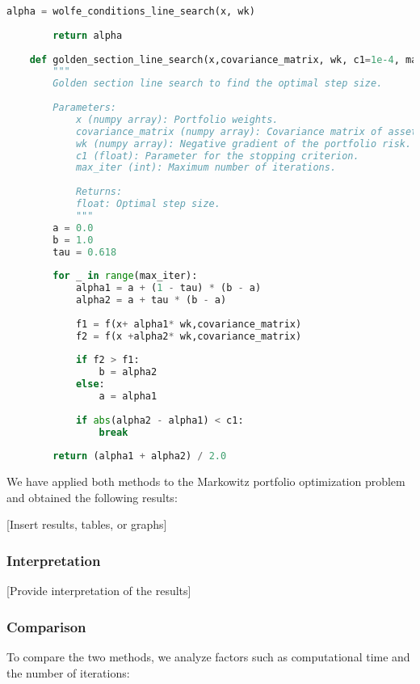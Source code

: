 \documentclass[12pt]{article}
\begin{document}
\begin{lstlisting}[language=Python]
            alpha = wolfe_conditions_line_search(x, wk)
    
        return alpha
    
    def golden_section_line_search(x,covariance_matrix, wk, c1=1e-4, max_iter=100):
        """
        Golden section line search to find the optimal step size.
        
        Parameters:
            x (numpy array): Portfolio weights.
            covariance_matrix (numpy array): Covariance matrix of asset returns.
            wk (numpy array): Negative gradient of the portfolio risk.
            c1 (float): Parameter for the stopping criterion.
            max_iter (int): Maximum number of iterations.
            
            Returns:
            float: Optimal step size.
            """
        a = 0.0
        b = 1.0
        tau = 0.618
    
        for _ in range(max_iter):
            alpha1 = a + (1 - tau) * (b - a)
            alpha2 = a + tau * (b - a)
    
            f1 = f(x+ alpha1* wk,covariance_matrix)
            f2 = f(x +alpha2* wk,covariance_matrix)
    
            if f2 > f1:
                b = alpha2
            else:
                a = alpha1
    
            if abs(alpha2 - alpha1) < c1:
                break
    
        return (alpha1 + alpha2) / 2.0

\end{lstlisting}


We have applied both methods to the Markowitz portfolio optimization problem and obtained the following results:

[Insert results, tables, or graphs]

\subsubsection*{Interpretation}

[Provide interpretation of the results]

\subsubsection*{Comparison}

To compare the two methods, we analyze factors such as computational time and the number of iterations:
\end{document}
